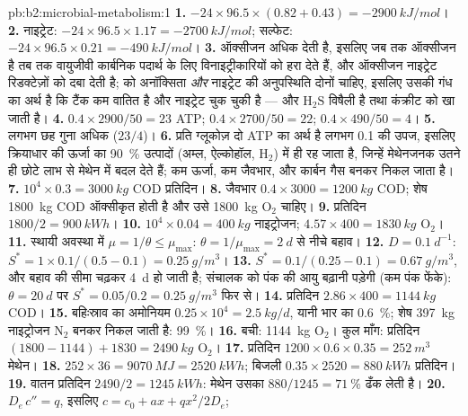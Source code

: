 \begin{solution}{pb:b2:microbial-metabolism:1}
\textbf{1.} $-24\times 96.5\times (0.82 + 0.43) = \qty{-2900}{kJ/mol}$।
\textbf{2.} नाइट्रेट: $-24\times 96.5\times 1.17 = \qty{-2700}{kJ/mol}$;
सल्फेट: $-24\times 96.5\times 0.21 = \qty{-490}{kJ/mol}$।
\textbf{3.} ऑक्सीजन अधिक देती है, इसलिए जब तक ऑक्सीजन है तब तक
वायुजीवी कार्बनिक पदार्थ के लिए विनाइट्रीकारियों को हरा देते हैं, और
ऑक्सीजन नाइट्रेट रिडक्टेज़ों को दबा देती है;  को अनॉक्सिता
\emph{और} नाइट्रेट की अनुपस्थिति दोनों चाहिए, इसलिए उसकी गंध का अर्थ है
कि टैंक कम वातित है और नाइट्रेट चुक चुकी है --- और $\mathrm{H_2S}$
विषैली है तथा कंक्रीट को खा जाती है।
\textbf{4.} $0.4\times 2900/50 = 23$ ATP; $0.4\times 2700/50 = 22$;
$0.4\times 490/50 = 4$।
\textbf{5.} लगभग छह गुना अधिक ($23/4$)।
\textbf{6.} प्रति ग्लूकोज़ दो ATP का अर्थ है लगभग \num{0.1} की उपज,
इसलिए क्रियाधार की ऊर्जा का \qty{90}{\%} उत्पादों (अम्ल,
ऐल्कोहॉल, $\mathrm{H_2}$) में ही रह जाता है, जिन्हें मेथेनजनक उतने ही
छोटे लाभ से मेथेन में बदल देते हैं; कम ऊर्जा, कम जैवभार, और कार्बन गैस
बनकर निकल जाता है।
\textbf{7.} $10^4\times 0.3 = \qty{3000}{kg}$ COD प्रतिदिन।
\textbf{8.} जैवभार $0.4\times 3000 = \qty{1200}{kg}$ COD; शेष
\qty{1800}{kg} COD ऑक्सीकृत होती है और उसे \qty{1800}{kg}
$\mathrm{O_2}$ चाहिए।
\textbf{9.} प्रतिदिन $1800/2 = \qty{900}{kWh}$।
\textbf{10.} $10^4\times 0.04 = \qty{400}{kg}$ नाइट्रोजन;
$4.57\times 400 = \qty{1830}{kg}$ $\mathrm{O_2}$।
\textbf{11.} स्थायी अवस्था में $\mu = 1/\theta \le \mu_{\max}$:
$\theta = 1/\mu_{\max} = \qty{2}{d}$ से नीचे बहाव।
\textbf{12.} $D = \qty{0.1}{d^{-1}}$: $S^* = 1\times 0.1/(0.5 - 0.1)
= \qty{0.25}{g/m^3}$।
\textbf{13.} $S^* = 0.1/(0.25 - 0.1) = \qty{0.67}{g/m^3}$, और बहाव
की सीमा चढ़कर \qty{4}{d} हो जाती है; संचालक को पंक की आयु बढ़ानी
पड़ेगी (कम पंक फेंके): $\theta = \qty{20}{d}$ पर $S^* =
0.05/0.2 = \qty{0.25}{g/m^3}$ फिर से।
\textbf{14.} प्रतिदिन $2.86\times 400 = \qty{1144}{kg}$ COD।
\textbf{15.} बहिःस्राव का अमोनियम $0.25\times 10^4 = \qty{2.5}{kg/d}$,
यानी भार का \qty{0.6}{\%}; शेष \qty{397}{kg} नाइट्रोजन
$\mathrm{N_2}$ बनकर निकल जाती है: \qty{99}{\%}।
\textbf{16.} बची: \qty{1144}{kg} $\mathrm{O_2}$। कुल माँग:
प्रतिदिन $(1800 - 1144) + 1830 = \qty{2490}{kg}$ $\mathrm{O_2}$।
\textbf{17.} प्रतिदिन $1200\times 0.6\times 0.35 = \qty{252}{m^3}$
मेथेन।
\textbf{18.} $252\times 36 = \qty{9070}{MJ} = \qty{2520}{kWh}$;
बिजली $0.35\times 2520 = \qty{880}{kWh}$ प्रतिदिन।
\textbf{19.} वातन प्रतिदिन $2490/2 = \qty{1245}{kWh}$: मेथेन उसका
$880/1245 = \qty{71}{\%}$ ढँक लेती है।
\textbf{20.} $D_e\,c'' = q$, इसलिए $c = c_0 + ax + qx^2/2D_e$;

\end{solution}
